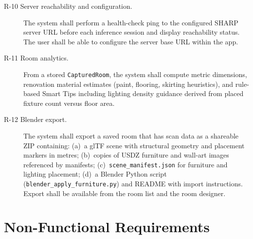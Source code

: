 \begin{description}
    \item[R-10 Server reachability and configuration.] The system shall perform a health-check ping to the configured SHARP server URL before each inference session and display reachability status. The user shall be able to configure the server base URL within the app.

    \item[R-11 Room analytics.] From a stored \texttt{CapturedRoom}, the system shall compute metric dimensions, renovation material estimates (paint, flooring, skirting heuristics), and rule-based Smart Tips including lighting density guidance derived from placed fixture count versus floor area.

    \item[R-12 Blender export.] The system shall export a saved room that has scan data as a shareable ZIP containing: (a)~a glTF scene with structural geometry and placement markers in metres; (b)~copies of USDZ furniture and wall-art images referenced by manifests; (c)~\texttt{scene\_manifest.json} for furniture and lighting placement; (d)~a Blender Python script (\texttt{blender\_apply\_furniture.py}) and README with import instructions. Export shall be available from the room list and the room designer.
\end{description}

\section{Non-Functional Requirements}
\label{sec:nfr_req}

